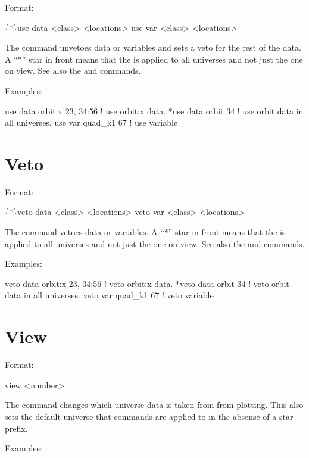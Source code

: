 Format:
\begin{example}
  \{*\}use data  <class> <locations>
  use var <class> <locations>
\end{example}

\vskip 0.2in The  command  unvetoes data or variables
and sets a veto for the rest of the data.
A ``*'' star in front means that the  is applied
to all universes and not just the one on view. See also the 
and  commands.

Examples:
\begin{example}
  use data orbit:x  23, 34:56 ! use orbit:x data.
  *use data orbit 34          ! use orbit data in all universes.
  use var quad_k1 67          ! use variable
\end{example}


\section{Veto}
\label{s:veto}

Format:
\begin{example}
  \{*\}veto data  <class> <locations>
  veto var <class> <locations>
\end{example}

\vskip 0.2in The  command  vetoes data or variables.
A ``*'' star in front means that the  is applied
to all universes and not just the one on view. See also the 
and  commands.

Examples:
\begin{example}
  veto data orbit:x  23, 34:56 ! veto orbit:x data.
  *veto data orbit 34          ! veto orbit data in all universes.
  veto var quad_k1 67     ! veto variable
\end{example}

\section{View}
\label{s:view}

Format:
\begin{example}
  view <number>
\end{example}

\vskip 0.2in The  command changes which universe data is
taken from from plotting.  This also sets the default universe that
commands are applied to in the absense of a star prefix.  

Examples:
